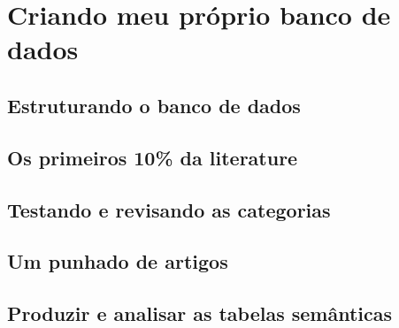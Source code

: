 \documentclass{article}
\begin{document}
\section{Criando meu próprio banco de dados}

\subsection{Estruturando o banco de dados}

\subsection{Os primeiros 10\% da literature}

\subsection{Testando e revisando as categorias}

\subsection{Um punhado de artigos}

\subsection{Produzir e analisar as tabelas semânticas}
\end{document}
